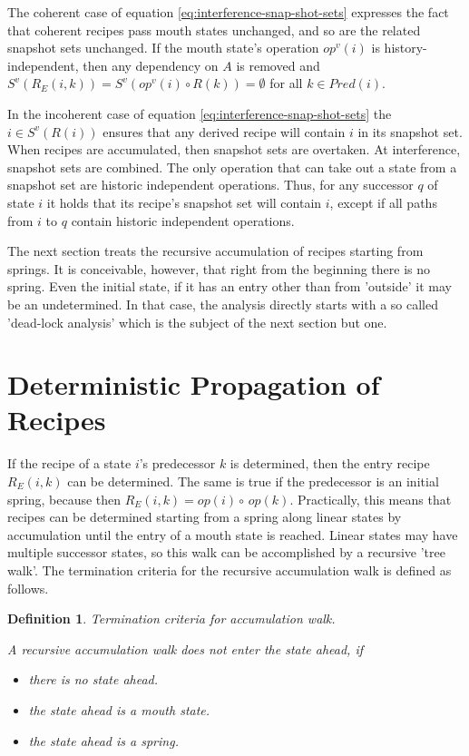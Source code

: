 \documentclass[12pt,a4paper]{scrartcl}
\newtheorem{definition}{Definition}
\begin{document}
The coherent case of equation \eqref{eq:interference-snap-shot-sets}
expresses the fact that coherent recipes pass mouth states unchanged, and so
are the related snapshot sets unchanged. If the mouth state's operation
$op^v(i)$ is history-independent, then any dependency on $A$ is removed and
$S^v(R_E(i,k))=S^v(op^v(i)\circ R(k))=\emptyset$ for all $k \in Pred(i)$.  

In the incoherent case of equation \eqref{eq:interference-snap-shot-sets}
the $i\in S^v(R(i))$ ensures that any derived recipe will contain $i$ in its
snapshot set.  When recipes are accumulated, then snapshot sets are overtaken.
At interference, snapshot sets are combined. The only operation that can take
out a state from a snapshot set are historic independent operations. Thus, for
any successor $q$ of state $i$ it holds that its recipe's snapshot set will
contain $i$, except if all paths from $i$ to $q$ contain historic independent
operations.

The next section treats the recursive accumulation of recipes starting from
springs.  It is conceivable, however, that right from the beginning there is no
spring.  Even the initial state, if it has an entry other than from 'outside'
it may be an undetermined.  In that case, the analysis directly starts with a
so called 'dead-lock analysis' which is the subject of the next section but
one.

%
\section{Deterministic Propagation of Recipes}

If the recipe of a state $i$'s predecessor $k$ is determined, then the entry
recipe $R_E(i,k)$ can be determined. The same is true if the predecessor is an initial
spring, because then $R_E(i,k) = op(i)\circ\,op(k)$. Practically, this means
that recipes can be determined starting from a spring along linear states by
accumulation until the entry of a mouth state is reached. Linear states may
have multiple successor states, so this walk can be accomplished by a recursive
'tree walk'.  The termination criteria for the recursive accumulation walk is
defined as follows.

\begin{definition}
Termination criteria for accumulation walk.

A recursive accumulation walk does not enter the state ahead, if 

\begin{itemize}
    \item there is no state ahead.
    \item the state ahead is a mouth state.
    \item the state ahead is a spring.
\end{itemize}
\end{definition}
\end{document}
